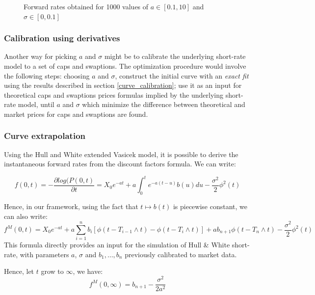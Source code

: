 \begin{figure}[!htb]
\begin{minipage}{0.5\textwidth}
        \caption{Forward rates obtained for 1000 values of $a \in [0.1, 10]$ and $\sigma \in [0, 0.1]$}
        \label{fig:sensi_a_sigma_2}
    \end{minipage}
  \end{figure}

\subsubsection{Calibration using derivatives}
\label{curvederivatives}

Another way for picking $a$ and $\sigma$ might be to calibrate the underlying short-rate model to a set of caps and swaptions. The optimization procedure would involve the following steps: choosing $a$ and $\sigma$, construct the initial curve with an \textit{exact fit} using the results described in  section \ref{curve_calibration}; use it as an input for theoretical caps and swaptions prices formulas implied by the underlying short-rate model, until $a$ and $\sigma$ which minimize the difference between theoretical and market prices for caps and swaptions are found. 


\subsubsection{Curve extrapolation}
\label{curveextrap}

Using the Hull and White extended Vasicek model, it is possible to derive the instantaneous forward rates from the discount factors formula. We can write:

\begin{equation}
f(0, t) = -\frac{\partial log(P(0,t)}{\partial t} =  X_0e^{-at} + a \int_0^t e^{-a(t-u)}b(u)du-\frac{\sigma^2}{2}\phi^2(t)
\end{equation}

Hence, in our framework, using the fact that $t \mapsto b(t)$ is piecewise constant, we can also write:
\begin{equation}
f^M(0, t) = X_0e^{-at} + a \sum_{i = 1}^n b_i \left[\phi(t-T_{i-1} \wedge t) - \phi(t-T_i \wedge t)\right]+ab_{n+1}\phi(t-T_n \wedge t)-\frac{\sigma^2}{2}\phi^2(t)
\end{equation}
This formula directly provides an input for the simulation of Hull \& White short-rate, with parameters $a$, $\sigma$ and $b_1, \ldots, b_n$ previously calibrated to market data.

\medskip

Hence, let $t$ grow to $\infty$, we have:
\begin{equation}
f^M(0, \infty) = b_{n+1}-\frac{\sigma^2}{2a^2}
\end{equation}

